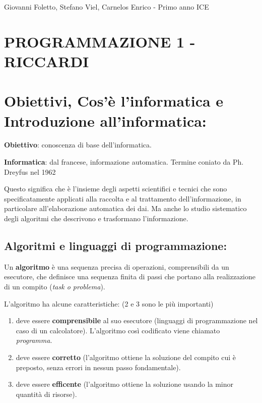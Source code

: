 \documentclass[
  paper=a4,
  oneside  ,captions=tableheading
]{scrbook}
\providecommand{\tightlist}{%
  \setlength{\itemsep}{0pt}\setlength{\parskip}{0pt}}
\begin{document}



Giovanni Foletto, Stefano Viel, Carnelos Enrico - Primo anno ICE

\hypertarget{programmazione-1---riccardi}{%
\section{PROGRAMMAZIONE 1 -
RICCARDI}\label{programmazione-1---riccardi}}

\hypertarget{obiettivi-cosuxe8-linformatica-e-introduzione-allinformatica}{%
\section{Obiettivi, Cos'è l'informatica e Introduzione
all'informatica:}\label{obiettivi-cosuxe8-linformatica-e-introduzione-allinformatica}}

\hspace{0pt} \textbf{Obiettivo}: conoscenza di base dell'informatica.

\hspace{0pt} \textbf{Informatica}: dal francese, informazione
automatica. Termine coniato da Ph. Dreyfus nel 1962

\hspace{0pt} Questo significa che è l'insieme degli aspetti scientifici
e tecnici che sono specificatamente applicati alla raccolta e al
trattamento dell'informazione, in particolare all'elaborazione
automatica dei dai. Ma anche lo studio sistematico degli algoritmi che
descrivono e trasformano l'informazione.

\hypertarget{algoritmi-e-linguaggi-di-programmazione}{%
\subsection{Algoritmi e linguaggi di
programmazione:}\label{algoritmi-e-linguaggi-di-programmazione}}

Un \textbf{algoritmo} è una sequenza precisa di operazioni,
comprensibili da un esecutore, che definisce una sequenza finita di
passi che portano alla realizzazione di un compito (\emph{task o
problema}).

L'algoritmo ha alcune caratteristiche: (2 e 3 sono le più importanti)

\begin{enumerate}
\def\labelenumi{\arabic{enumi}.}
\tightlist
\item
  deve essere \textbf{comprensibile} al suo esecutore (linguaggi di
  programmazione nel caso di un calcolatore). L'algoritmo così
  codificato viene chiamato \emph{programma}.
\item
  deve essere \textbf{corretto } (l'algoritmo ottiene la soluzione del
  compito cui è preposto, senza errori in nessun passo fondamentale).
\item
  deve essere \textbf{efficente} (l'algoritmo ottiene la soluzione
  usando la minor quantità di risorse).
\end{enumerate}
\end{document}
